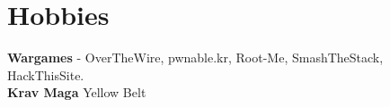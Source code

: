 \documentclass[10pt,letterpaper]{clar-resume}
\begin{document}
\begin{minipage}[t]{0.33\textwidth}
\smallspace


\section{Hobbies}
\textbullet{} \textbf{Wargames} - OverTheWire, pwnable.kr, Root-Me, SmashTheStack, HackThisSite.\\
\textbullet{} \textbf{Krav Maga} Yellow Belt

\end{minipage} %
\hfill
%
%
\end{document}
